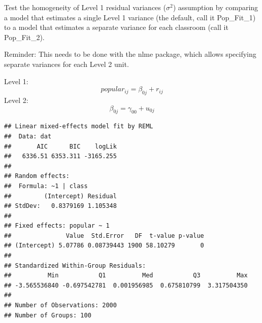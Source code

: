 \documentclass[]{article}
\newenvironment{Shaded}{\begin{snugshade}}{\end{snugshade}}
\newcommand{\KeywordTok}[1]{\textcolor[rgb]{0.13,0.29,0.53}{\textbf{#1}}}
\newcommand{\DataTypeTok}[1]{\textcolor[rgb]{0.13,0.29,0.53}{#1}}
\newcommand{\DecValTok}[1]{\textcolor[rgb]{0.00,0.00,0.81}{#1}}
\newcommand{\StringTok}[1]{\textcolor[rgb]{0.31,0.60,0.02}{#1}}
\newcommand{\OperatorTok}[1]{\textcolor[rgb]{0.81,0.36,0.00}{\textbf{#1}}}
\newcommand{\NormalTok}[1]{#1}
\begin{document}
Test the homogeneity of Level 1 residual variances (\(\sigma^2\))
assumption by comparing a model that estimates a single Level 1 variance
(the default, call it Pop\_Fit\_1) to a model that estimates a separate
variance for each classroom (call it Pop\_Fit\_2).

Reminder: This needs to be done with the nlme package, which allows
specifying separate variances for each Level 2 unit.

Level 1: \[popular_{ij} = \beta_{0j} + r_{ij}\] Level 2:
\[\beta_{0j} = \gamma_{00} + u_{0j}\]

\begin{Shaded}
\end{Shaded}

\begin{verbatim}
## Linear mixed-effects model fit by REML
##  Data: dat 
##       AIC      BIC    logLik
##   6336.51 6353.311 -3165.255
## 
## Random effects:
##  Formula: ~1 | class
##         (Intercept) Residual
## StdDev:   0.8379169 1.105348
## 
## Fixed effects: popular ~ 1 
##               Value  Std.Error   DF  t-value p-value
## (Intercept) 5.07786 0.08739443 1900 58.10279       0
## 
## Standardized Within-Group Residuals:
##          Min           Q1          Med           Q3          Max 
## -3.565536840 -0.697542781  0.001956985  0.675810799  3.317504350 
## 
## Number of Observations: 2000
## Number of Groups: 100
\end{verbatim}
\end{document}
